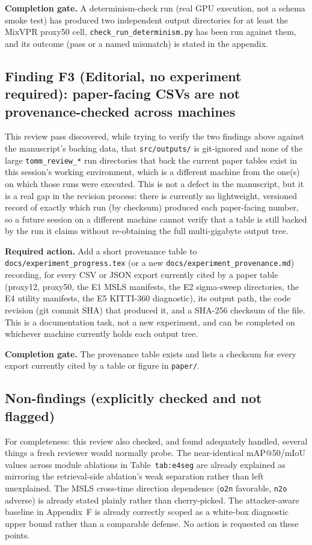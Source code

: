 \documentclass[11pt]{article}
\begin{document}
\textbf{Completion gate.} A determinism-check run (real GPU execution,
not a schema smoke test) has produced two independent output directories for
at least the MixVPR proxy50 cell, \texttt{check\_run\_determinism.py} has been
run against them, and its outcome (pass or a named mismatch) is stated in the
appendix.

\subsection*{Finding F3 (Editorial, no experiment required): paper-facing CSVs are not provenance-checked across machines}
\label{sec:f3}
This review pass discovered, while trying to verify the two findings above
against the manuscript's backing data, that \texttt{src/outputs/} is
git-ignored and none of the large \texttt{tomm\_review\_*} run directories
that back the current paper tables exist in this session's working
environment, which is a different machine from the one(s) on which those runs
were executed. This is not a defect in the manuscript, but it is a real gap
in the revision process: there is currently no lightweight, versioned record
of exactly which run (by checksum) produced each paper-facing number, so a
future session on a different machine cannot verify that a table is still
backed by the run it claims without re-obtaining the full multi-gigabyte
output tree.

\textbf{Required action.} Add a short provenance table to
\texttt{docs/experiment\_progress.tex} (or a new
\texttt{docs/experiment\_provenance.md}) recording, for every CSV or JSON
export currently cited by a paper table (proxy12, proxy50, the E1 MSLS
manifests, the E2 sigma-sweep directories, the E4 utility manifests, the E5
KITTI-360 diagnostic), its output path, the code revision (git commit SHA)
that produced it, and a SHA-256 checksum of the file. This is a documentation
task, not a new experiment, and can be completed on whichever machine
currently holds each output tree.

\textbf{Completion gate.} The provenance table exists and lists a checksum
for every export currently cited by a table or figure in \texttt{paper/}.

\subsection*{Non-findings (explicitly checked and not flagged)}
For completeness: this review also checked, and found adequately handled,
several things a fresh reviewer would normally probe. The near-identical
mAP@50/mIoU values across module ablations in Table~\texttt{tab:e4seg} are
already explained as mirroring the retrieval-side ablation's weak
separation rather than left unexplained. The MSLS cross-time direction
dependence (\texttt{o2n} favorable, \texttt{n2o} adverse) is already stated
plainly rather than cherry-picked. The attacker-aware baseline in
Appendix~F is already correctly scoped as a white-box diagnostic upper
bound rather than a comparable defense. No action is requested on these
points.
\end{document}
